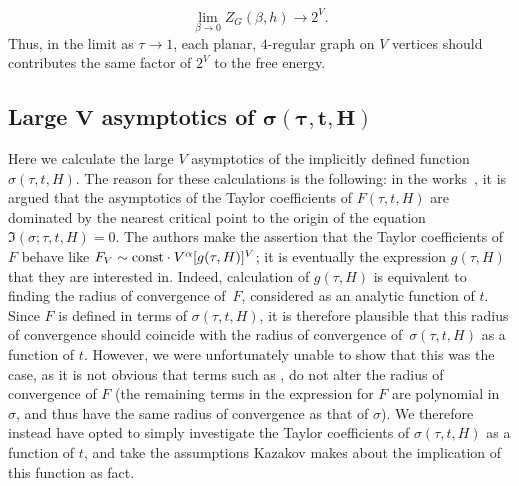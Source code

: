 \documentclass[10pt,a4paper]{amsart}
\numberwithin{equation}{section}
\begin{document}
\begin{Remark}
 \begin{equation*}
 \lim_{\beta\to 0}Z_G(\beta,h) \to 2^V.
 \end{equation*}
 Thus, in the limit as $\tau\to 1$, each planar, $4$-regular graph on $V$ vertices should contributes the same factor of $2^V$ to the free energy.
\end{Remark}

\subsection[Large $V$ asymptotics of $\sigma(\tau,t,H)$]{Large $\boldsymbol{V}$ asymptotics of $\boldsymbol{\sigma(\tau,t,H)}$}
Here we calculate the large $V$ asymptotics of the implicitly defined function $\sigma(\tau,t,H)$. The reason for these calculations is the following: in the works~\cite{Kazakov2,Kazakov1}, it is argued that the asymptotics of the Taylor coefficients of $F(\tau,t,H)$ are dominated by the nearest critical point to the origin of the equation $\mathfrak{I}(\sigma;\tau,t,H) = 0$. The authors make the assertion that the Taylor coefficients of~$F$ behave like $F_V \sim {\rm const}\cdot V^\alpha[g(\tau,H)]^V$; it is eventually the expression $g(\tau,H)$ that they are interested in. Indeed, calculation of $g(\tau,H)$ is equivalent to finding the radius of convergence of~$F$, considered
as an analytic function of $t$. Since $F$ is defined in terms of $\sigma(\tau,t,H)$, it is therefore plausible that this radius of convergence should coincide with the radius of convergence of~$\sigma(\tau,t,H)$ as a function of $t$. However, we were unfortunately unable to show
that this was the case, as it is not obvious that terms such as ,  do
not alter the radius of convergence of $F$ (the remaining terms in the expression for $F$ are polynomial in $\sigma$, and thus have the same radius of convergence as that of $\sigma$). We therefore instead have opted to simply investigate the Taylor coefficients of $\sigma(\tau,t,H)$ as a function of $t$, and take the assumptions Kazakov makes about the implication of this function as fact.
\end{document}
